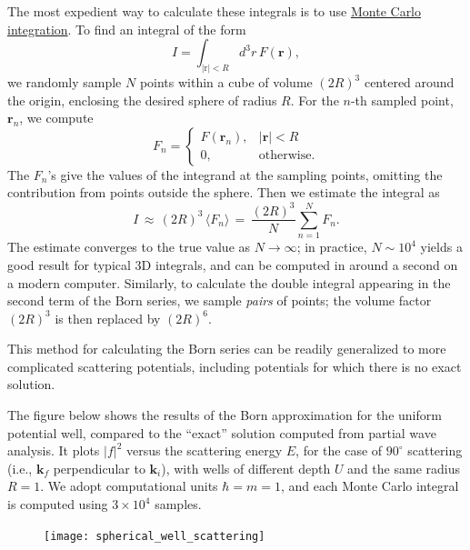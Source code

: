 \documentclass[pra,12pt]{revtex4}
\begin{document}
The most expedient way to calculate these integrals is to use
\href{https://en.wikipedia.org/wiki/Monte_Carlo_integration}{Monte
  Carlo integration}.  To find an integral of the form
\begin{equation}
  I = \int_{|\mathrm{r}|<R} d^3r \, F(\mathbf{r}),
\end{equation}
we randomly sample $N$ points within a cube of volume $(2R)^3$
centered around the origin, enclosing the desired sphere of radius
$R$.  For the $n$-th sampled point, $\mathbf{r}_n$, we compute
\begin{equation}
  F_n = \begin{cases}F(\mathbf{r}_n), & |\mathbf{r}| < R \\ 0, &\mathrm{otherwise}.\end{cases}
\end{equation}
The $F_n$'s give the values of the integrand at the sampling points,
omitting the contribution from points outside the sphere.  Then we
estimate the integral as
\begin{equation}
  I \,\approx\, (2R)^3 \, \langle F_n\rangle \,=\, \frac{(2R)^3}{N} \sum_{n=1}^N F_n.
\end{equation}
The estimate converges to the true value as $N\rightarrow\infty$; in
practice, $N \sim 10^4$ yields a good result for typical 3D integrals,
and can be computed in around a second on a modern computer.
Similarly, to calculate the double integral appearing in the second
term of the Born series, we sample \textit{pairs} of points; the
volume factor $(2R)^3$ is then replaced by $(2R)^6$.

This method for calculating the Born series can be readily generalized
to more complicated scattering potentials, including potentials for
which there is no exact solution.

The figure below shows the results of the Born approximation for the
uniform potential well, compared to the ``exact'' solution computed
from partial wave analysis.  It plots $|f|^2$ versus the scattering
energy $E$, for the case of $90^\circ$ scattering (i.e.,
$\mathbf{k}_f$ perpendicular to $\mathbf{k}_i$), with wells of
different depth $U$ and the same radius $R = 1$.  We adopt
computational units $\hbar = m = 1$, and each Monte Carlo integral is
computed using $3\times10^4$ samples.

\begin{figure}[h]
  \centering\texttt{[image: spherical\_well\_scattering]}
\end{figure}
\end{document}
